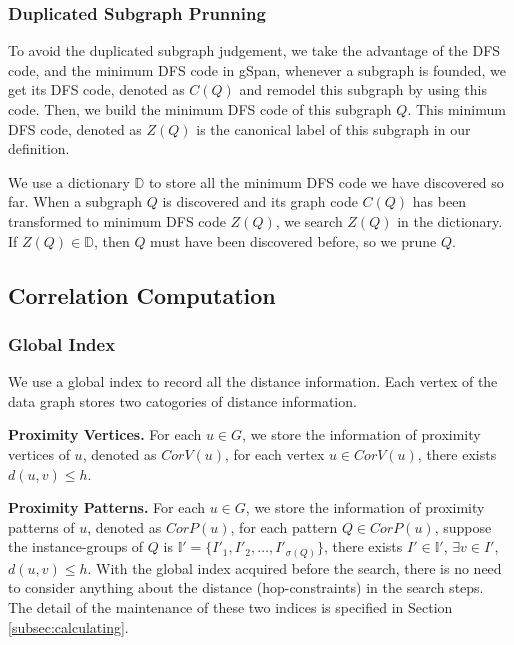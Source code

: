 \subsubsection{Duplicated Subgraph Prunning}
To avoid the duplicated subgraph judgement, we take the advantage of the DFS code, and the minimum DFS code in gSpan\cite{YH02}, whenever a subgraph is founded, we get its DFS code, denoted as $C(Q)$ and remodel this subgraph by using this code. Then, we build the minimum DFS code of this subgraph $Q$. This minimum DFS code, denoted as $Z(Q)$ is the canonical label of this subgraph in our definition.

\par We use a dictionary $\mathbb{D}$ to store all the minimum DFS code we have discovered so far. When a subgraph $Q$ is discovered and its graph code $C(Q)$ has been transformed to minimum DFS code $Z(Q)$, we search $Z(Q)$ in the dictionary. If $Z(Q)\in \mathbb{D}$, then $Q$ must have been discovered before, so we prune $Q$.


\subsection{Correlation Computation}
\label{subsec:corrcomp}

\subsubsection{Global Index}
\label{subsec:global-index}

We use a global index to record all the distance information. Each vertex of the data graph stores two catogories of distance information.

\squishlist
\item{\bf Proximity Vertices.} For each $u\in G$, we store the information of proximity vertices of $u$, denoted as $CorV(u)$, for each vertex $u\in CorV(u)$, there exists $d(u,v)\le h$.
\squishend
\squishlist
\item{\bf Proximity Patterns.} For each $u\in G$, we store the information of proximity patterns of $u$, denoted as $CorP(u)$, for each pattern $Q\in CorP(u)$, suppose the instance-groups of $Q$ is $\mathbb{I'}=\{I'_1,I'_2,\ldots,I'_{\sigma(Q)}\}$, there exists $I'\in \mathbb{I'}$, $\exists v\in I'$, $d(u,v)\le h$.
\squishend
With the global index acquired before the search, there is no need to consider anything about the distance (hop-constraints) in the search steps. The detail of the maintenance of these two indices is specified in Section \ref{subsec:calculating}.

